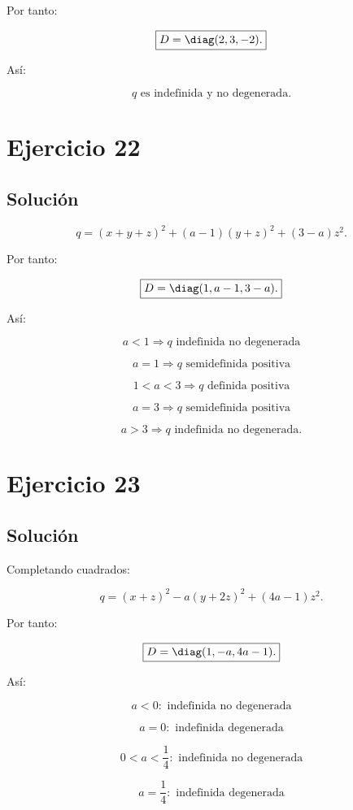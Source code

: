 \documentclass[11pt,a4paper]{article}
\begin{document}
Por tanto:

\[
\boxed{
D=\diag(2,3,-2).
}
\]

Así:

\[
\boxed{
q\text{ es indefinida y no degenerada}.
}
\]

\section{Ejercicio 22}
\subsection{Solución}

\[
q
=
(x+y+z)^2
+
(a-1)(y+z)^2
+
(3-a)z^2.
\]

Por tanto:

\[
\boxed{
D=
\diag(1,a-1,3-a).
}
\]

Así:

\[
\boxed{
a<1
\Longrightarrow
q\text{ indefinida no degenerada}
}
\]

\[
\boxed{
a=1
\Longrightarrow
q\text{ semidefinida positiva}
}
\]

\[
\boxed{
1<a<3
\Longrightarrow
q\text{ definida positiva}
}
\]

\[
\boxed{
a=3
\Longrightarrow
q\text{ semidefinida positiva}
}
\]

\[
\boxed{
a>3
\Longrightarrow
q\text{ indefinida no degenerada}.
}
\]

\section{Ejercicio 23}
\subsection{Solución}

Completando cuadrados:

\[
q
=
(x+z)^2
-
a(y+2z)^2
+
(4a-1)z^2.
\]

Por tanto:

\[
\boxed{
D=
\diag(1,-a,4a-1).
}
\]

Así:

\[
\boxed{
a<0:
\text{ indefinida no degenerada}
}
\]

\[
\boxed{
a=0:
\text{ indefinida degenerada}
}
\]

\[
\boxed{
0<a<\frac14:
\text{ indefinida no degenerada}
}
\]

\[
\boxed{
a=\frac14:
\text{ indefinida degenerada}
}
\]
\end{document}
